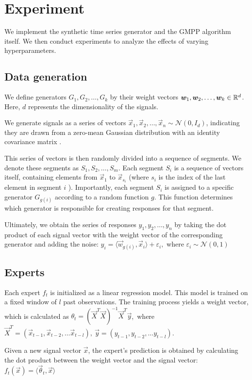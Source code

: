 \documentclass[12pt, twoside]{article}
\begin{document}
\section{Experiment}
We implement the synthetic time series generator and the GMPP algorithm itself. 
We then conduct experiments to analyze the effects of varying hyperparameters.
\subsection{Data generation}

We define generators $G_1, G_2, \dots, G_k$ by their weight vectors $\boldsymbol{w}_1, \boldsymbol{w}_2, \dots, \boldsymbol{w}_k \in \mathbb{R}^d$. 
Here, $d$ represents the dimensionality of the signals.

We generate signals as a series of vectors $\vec x_1, \vec x_2, \dots, \vec x_n \sim \mathcal{N}(0, I_d)$, indicating they are drawn from a zero-mean Gaussian distribution with an identity covariance matrix .

This series of vectors is then randomly divided into a sequence of segments. 
We denote these segments as $S_1, S_2, \dots, S_m$. 
Each segment $S_i$ is a sequence of vectors itself, containing elements from $\vec x_1$ to $\vec x_{s_i}$ (where $s_i$ is the index of the last element in segment $i$ ). 
Importantly, each segment $S_i$ is assigned to a specific generator $G_{g(i)}$ according to a random function $g$. 
This function determines which generator is responsible for creating responses for that segment.

Ultimately, we obtain the series of responses $y_1, y_2, \dots, y_n$ by taking the dot product of each signal vector with the weight vector of the corresponding  generator and adding the noise: $y_i = \langle \vec w_{g(i)}, \vec x_i \rangle + \varepsilon_i,$ where $\varepsilon_i \sim \mathcal{N}(0, 1)$ 

\subsection{Experts}

Each expert $f_t$ is initialized as a linear regression model. This model is trained on a fixed window of $l$ past observations. The training process yields a weight vector, which is calculated as  $\theta_t = (\vec X^T\vec X)^{-1}\vec X^T\vec y$,\ where $\vec X^T = (\vec x_{t-1}, \vec x_{t-2}, \dots \vec x_{t-l}),\ \vec y = (y_{t-1}, y_{t-2}, \dots y_{t-l})$. 

Given a new signal vector  $\vec x$, the expert's prediction is obtained by calculating the dot product between the weight vector and the signal vector: $f_t(\vec x) = \langle \vec \theta_t, \vec x \rangle$ 
\end{document}
